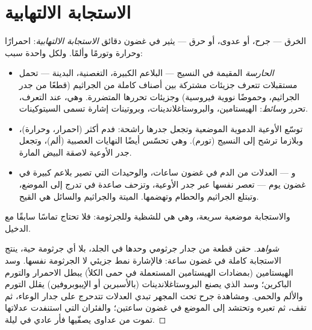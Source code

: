 \section{الاستجابة الالتهابية}

\begin{proposition}\label{prop:g12:innate-immunity:inflammation}
الخرق --- جرح، أو عدوى، أو حرق --- يثير في غضون دقائق
\emph{الاستجابة الالتهابية}: احمرارًا وحرارة وتورمًا
وألمًا. ولكل واحدة سبب:
\begin{itemize}
  \item \emph{ الحارسة} المقيمة في النسيج --- البلاعم الكبيرة،
         التغصنية،  البدينة --- تحمل مستقبلات تتعرف
        جزيئات مشتركة بين أصناف كاملة من الجراثيم (قطعًا من جدر
        الجراثيم، وحموضًا نووية فيروسية) وجزيئات تحررها 
        المتضررة. وهي، عند التعرف، تحرر
        \emph{وسائط}: الهيستامين،
        والبروستاغلاندينات، وبروتينات إشارة تسمى السيتوكينات.
  \item {} توسّع الأوعية الدموية الموضعية وتجعل جدرها راشحة:
        فدم أكثر (احمرار، وحرارة)، وبلازما ترشح إلى النسيج (تورم). وهي
        تحسّس أيضًا النهايات العصبية (ألم)، وتجعل جدر الأوعية لاصقة
         البيض المارة.
  \item و\emph{} --- العدلات من الدم في غضون ساعات، والوحيدات
        التي تصير بلاعم كبيرة في غضون يوم --- تعصر نفسها عبر جدر
        الأوعية، وتزحف صاعدة في تدرج  إلى الموضع، وتبتلع
        الجراثيم والحطام وتهضمها.  الميتة والجراثيم والسائل
        هي القيح.
\end{itemize}
والاستجابة موضعية سريعة، وهي هي للشظية وللجرثومة: فلا تحتاج تماسًا
سابقًا مع الدخيل.
\end{proposition}
\begin{proof}[شواهد]
حقن قطعة من جدار جرثومي وحدها في الجلد، بلا أي جرثومة حية، ينتج
الاستجابة كاملة في غضون ساعة: فالإشارة نمط جزيئي لا الجرثومة نفسها.
وسد الهيستامين (بمضادات الهيستامين المستعملة في حمى الكلأ) يبطل
الاحمرار والتورم الباكرين؛ وسد  الذي يصنع البروستاغلاندينات
(بالأسبرين أو الإيبوبروفين) يقلل التورم والألم والحمى. ومشاهدة جرح
تحت المجهر تبدي العدلات تتدحرج على جدار الوعاء، ثم تقف، ثم تعبره
وتحتشد إلى الموضع في غضون ساعتين؛ والفئران التي استنفدت عدلاتها تموت
من عداوى يصفّيها فأر عادي في ليلة.
\end{proof}

